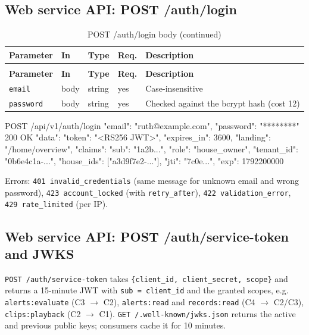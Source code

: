 \subsection{Web service API: POST /auth/login}
\begin{longtable}{L{2.6cm}L{1.4cm}L{1.8cm}L{1.1cm}L{7.0cm}}
\caption{POST /auth/login body}\\
\toprule
\textbf{Parameter} & \textbf{In} & \textbf{Type} & \textbf{Req.} & \textbf{Description} \\
\midrule
\endfirsthead
\caption[]{POST /auth/login body (continued)}\\
\toprule
\textbf{Parameter} & \textbf{In} & \textbf{Type} & \textbf{Req.} & \textbf{Description} \\
\midrule
\endhead
\texttt{email} & body & string & yes & Case-insensitive \\
\texttt{password} & body & string & yes & Checked against the bcrypt hash (cost 12) \\
\bottomrule
\end{longtable}
\begin{Shaded}
\begin{Code}
POST /api/v1/auth/login  { "email": "ruth@example.com", "password": "********" }
200 OK { "data": { "token": "<RS256 JWT>", "expires_in": 3600, "landing": "/home/overview",
                   "claims": { "sub": "1a2b...", "role": "house_owner", "tenant_id": "0b6e4c1a-...",
                               "house_ids": ["a3d9f7e2-..."], "jti": "7c0e...", "exp": 1792200000 } } }
\end{Code}
\end{Shaded}
\noindent Errors: \texttt{401 invalid\_credentials} (same message for unknown email and wrong password),
\texttt{423 account\_locked} (with \texttt{retry\_after}), \texttt{422 validation\_error}, \texttt{429 rate\_limited} (per IP).

\subsection{Web service API: POST /auth/service-token and JWKS}
\texttt{POST /auth/service-token} takes \texttt{\{client\_id, client\_secret, scope\}} and returns a 15-minute JWT
with \texttt{sub = client\_id} and the granted scopes, e.g. \texttt{alerts:evaluate} (C3 $\rightarrow$ C2),
\texttt{alerts:read} and \texttt{records:read} (C4 $\rightarrow$ C2/C3), \texttt{clips:playback} (C2 $\rightarrow$ C1).
\texttt{GET /.well-known/jwks.json} returns the active and previous public keys; consumers cache it for 10 minutes.

